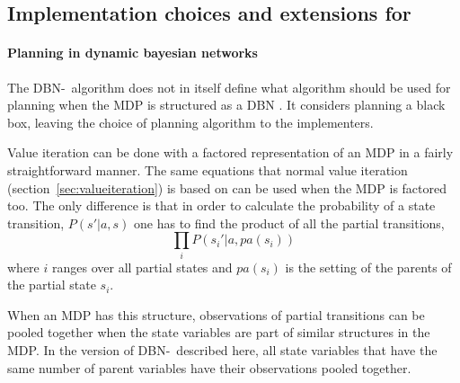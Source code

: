 \subsection{Implementation choices and extensions for \etre}
\label{sec:e3_our_contribution}

\paragraph{Planning in dynamic bayesian networks}

The DBN-\etre\ algorithm does not in itself define what algorithm should be
used for planning when the MDP is structured as a DBN
\parencite{kearns1999efficient}. It considers planning a black box, leaving the
choice of planning algorithm to the implementers. 

Value iteration can be done with a factored representation of an MDP in a
fairly straightforward manner. The same equations that normal value iteration
(section~\ref{sec:valueiteration}) is based on can be used when the MDP is
factored too. The only difference is that in order to calculate the probability
of a state transition, $P(s'| a, s)$ one has to find the product of all the
partial transitions,
\begin{equation}
  \prod\limits _{i} P\left(s_i' | a, pa(s_i)\right)
\end{equation}
where $i$ ranges over all partial states and $pa(s_i)$ is the setting of the
parents of the partial state $s_i$.

When an MDP has this structure, observations of partial transitions can be
pooled together when the state variables are part of similar structures in the
MDP. In the version of DBN-\etre\ described here, all state variables that have
the same number of parent variables have their observations pooled together. 


